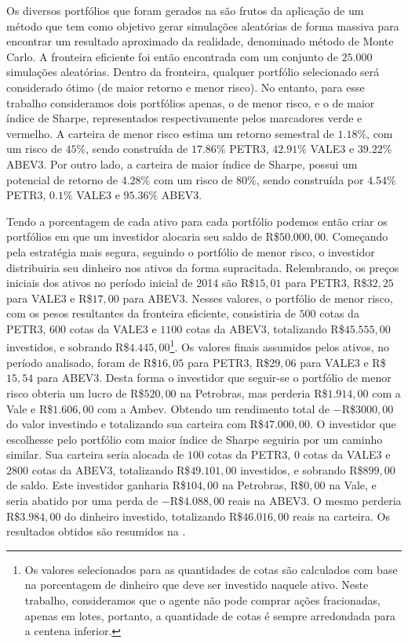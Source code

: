 
Os diversos portfólios que foram gerados na  são frutos da aplicação de um método que tem como objetivo gerar simulações aleatórias de forma massiva para encontrar um resultado aproximado da realidade, denominado método de Monte Carlo. A fronteira eficiente foi então encontrada com um conjunto de $25.000$ simulações aleatórias. Dentro da fronteira, qualquer portfólio selecionado será considerado ótimo (de maior retorno e menor risco). No entanto, para esse trabalho consideramos dois portfólios apenas, o de menor risco, e o de maior índice de Sharpe, representados respectivamente pelos marcadores verde e vermelho. A carteira de menor risco estima um retorno semestral de $1.18\%$, com um risco de $45\%$, sendo construída de $17.86\%$ PETR3, $42.91\%$ VALE3 e $39.22\%$ ABEV3. Por outro lado, a carteira de maior índice de Sharpe, possui um potencial de retorno de $4.28\%$ com um risco de $80\%$, sendo construída por $4.54\%$ PETR3, $0.1\%$ VALE3 e $95.36\%$ ABEV3.

Tendo a porcentagem de cada ativo para cada portfólio podemos então criar os portfólios em que um investidor alocaria seu saldo de R\$$50.000,00$. Começando pela estratégia mais segura, seguindo o portfólio de menor risco, o investidor distribuiria seu dinheiro nos ativos da forma supracitada. Relembrando, os preços iniciais dos ativos no período inicial de 2014 são R\$$15,01$ para PETR3, R\$$32,25$ para VALE3 e R\$$17,00$ para ABEV3. Nesses valores, o portfólio de menor risco, com os pesos resultantes da fronteira eficiente, consistiria de $500$ cotas da PETR3, $600$ cotas da VALE3 e $1100$ cotas da ABEV3, totalizando R\$$45.555,00$ investidos, e sobrando R\$$4.445,00$\footnote{Os valores selecionados para as quantidades de cotas são calculados com base na porcentagem de dinheiro que deve ser investido naquele ativo. Neste trabalho, consideramos que o agente não pode comprar ações fracionadas, apenas em lotes, portanto, a quantidade de cotas é sempre arredondada para a centena inferior.}. Os valores finais assumidos pelos ativos, no período analisado, foram de R\$$16,05$ para PETR3, R\$$29,06$ para VALE3 e R\$$15,54$ para ABEV3. Desta forma o investidor que seguir-se o portfólio de menor risco obteria um lucro de R\$$520,00$ na Petrobras, mas perderia R\$$1.914,00$ com a Vale e R\$$1.606,00$ com a Ambev. Obtendo um rendimento total de $-$R\$$3000,00$ do valor investindo e totalizando sua carteira com R\$$47.000,00$. O investidor que escolhesse pelo portfólio com maior índice de Sharpe seguiria por um caminho similar. Sua carteira seria alocada de $100$ cotas da PETR3, $0$ cotas da VALE3 e $2800$ cotas da ABEV3, totalizando R\$$49.101,00$ investidos, e sobrando R\$$899,00$ de saldo. Este investidor ganharia R\$$104,00$ na Petrobras, R\$$0,00$ na Vale, e seria abatido por uma perda de $-$R\$$4.088,00$ reais na ABEV3. O mesmo perderia R\$$3.984,00$ do dinheiro investido, totalizando R\$$46.016,00$ reais na carteira. Os resultados obtidos são resumidos na .

